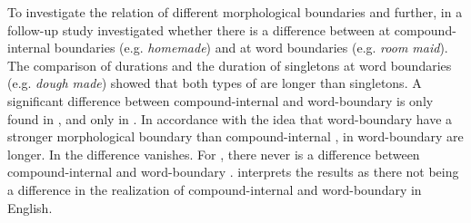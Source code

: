 To investigate the relation of different morphological boundaries and  further, in a follow-up study \cite{Oh.2013} investigated whether there is a difference between  at compound-internal boundaries (e.g. \textit{homemade}) and  at word boundaries (e.g. \textit{room maid}). The comparison of  durations and the duration of singletons at word boundaries (e.g. \textit{dough made}) showed that both types of  are longer than singletons. A significant difference between compound-internal and word-boundary  is only found in , and only in . In accordance with the idea that word-boundary  have a stronger morphological boundary than compound-internal ,  in  word-boundary  are longer. In  the difference vanishes. For , there never is a difference between compound-internal and word-boundary . \cite{Oh.2013} interprets the results as there not being a difference in the realization of compound-internal and word-boundary  in English. 


